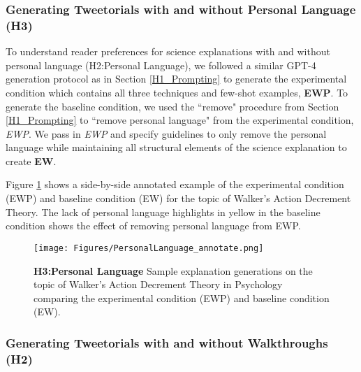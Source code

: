 \subsubsection{Generating Tweetorials with and without Personal Language (H3)} \label{H3_Prompting}
To understand reader preferences for science explanations with and without personal language (H2:Personal Language), we followed a similar GPT-4 generation protocol as in Section \ref{H1_Prompting} to generate the experimental condition which contains all three techniques and few-shot examples, \textbf{EWP}. To generate the baseline condition, we used the ``remove" procedure from Section \ref{H1_Prompting} to ``remove personal language" from the experimental condition, \textit{EWP}. We pass in \textit{EWP} and specify guidelines to only remove the personal language while maintaining all structural elements of the science explanation to create \textbf{EW}. 

Figure \ref{fig:personal} shows a side-by-side annotated example of the experimental condition (EWP) and baseline condition (EW) for the topic of Walker's Action Decrement Theory. The lack of personal language highlights in yellow in the baseline condition shows the effect of removing personal language from EWP. 

\begin{figure}
    \centering
    \texttt{[image: Figures/PersonalLanguage\_annotate.png]}
    \caption{\textbf{H3:Personal Language} Sample explanation generations on the topic of Walker's Action Decrement Theory in Psychology comparing the experimental condition (EWP) and baseline condition (EW).}
    \label{fig:personal}
\end{figure}




\subsubsection{Generating Tweetorials with and without Walkthroughs (H2)} \label{H2_Prompting}

